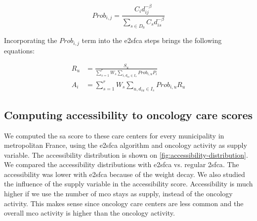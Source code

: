 \begin{equation}
    Prob_{i,j} = \frac{C_i d_{ij}^{-\beta}}{\sum_{s \in D_0} C_s d_{is}^{-\beta}}
    \label{eq:huff-prob}
\end{equation}

Incorporating the $Prob_{i,j}$ term into the \ac{e2sfca} steps brings the
following equations:

\begin{align}
    R_u & =  \frac{S_u}{\sum_{s=1}^{r} W_s \sum_{i, d_{iu} \in I_s} Prob_{i,u} P_i} \\
    A_i & = \sum_{s=1}^{r} W_s \sum_{u, d_{iu} \in I_s} Prob_{i,u} R_u
\end{align}

\subsection{Computing accessibility to oncology care scores}

We computed the \ac{sa} score to these care centers for every municipality in
metropolitan France, using the \ac{e2sfca} algorithm and oncology activity as
supply variable. The accessibility distribution is shown on
\cref{fig:accessibility-distribution}. We compared the accessibility
distributions with \ac{e2sfca} vs. regular \ac{2sfca}. The accessibility was
lower with \ac{e2sfca} because of the weight decay. We also studied the
influence of the supply variable in the accessibility score. Accessibility is
much higher if we use the number of \ac{mco} stays as supply, instead of the
oncology activity. This makes sense since oncology care centers are less common
and the overall \ac{mco} activity is higher than the oncology activity.

